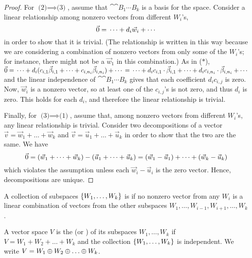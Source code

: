\begin{proof}
For $\text{(2)}\implies\text{(3)}$,
assume that $\cat{\cat{B_1}{\cdots}}{B_k}$ is a basis for the space.
Consider a linear relationship among nonzero vectors from different
$W_i$'s, 
\begin{equation*}
  \vec{0}=\mbox{}\dots+d_i\vec{w}_i+\cdots\mbox{}
\end{equation*}
in order to show that it is trivial.
(The relationship is written in this way because we are considering a
combination of nonzero vectors from only some of the $W_i$'s; 
for instance, there might not be a $\vec{w}_1$ in this combination.)
As in ($*$),
$
  \vec{0} 
   = \mbox{}\dots
      +d_i(c_{i,1}\vec{\beta}_{i,1}+\dots+c_{i,n_i}\vec{\beta}_{i,n_i})
      +\cdots\mbox{}                                                       
   = \mbox{}\dots
      +d_ic_{i,1}\cdot\vec{\beta}_{i,1}
      +\dots+
      d_ic_{i,n_i}\cdot\vec{\beta}_{i,n_i}
      +\cdots\mbox{}                                                      
$
and the linear independence of $\cat{\cat{B_1}{\cdots}}{B_k}$ gives that each
coefficient $d_ic_{i,j}$ is zero.
Now, $\vec{w}_i$ is a nonzero vector, so at least one of the 
$c_{i,j}$'s is not zero, and thus $d_i$ is zero.
This holds for each $d_i$, and therefore 
the linear relationship is trivial.

Finally, for $\text{(3)}\implies\text{(1)}$,
assume that, among nonzero vectors from different $W_i$'s, any linear
relationship is trivial.
Consider two decompositions of a vector 
$\vec{v}=\vec{w}_1+\dots+\vec{w}_k$ and $\vec{v}=\vec{u}_1+\dots+\vec{u}_k$
in order to show that the two are the same.
We have
\begin{equation*}
  \vec{0}
   =(\vec{w}_1+\dots+\vec{w}_k)
    -(\vec{u}_1+\dots+\vec{u}_k)
   =(\vec{w}_1-\vec{u}_1)+\dots+(\vec{w}_k-\vec{u}_k)
\end{equation*}
which violates the assumption unless each $\vec{w}_i-\vec{u}_i$ is the zero
vector.
Hence, decompositions are unique.
\end{proof}

\begin{definition}
A collection of subspaces \( \mbox{$\{W_1,\ldots, W_k\}$} \) is
if no nonzero vector from any \( W_i \) is a linear combination of
vectors from the other subspaces \( W_1,\dots, W_{i-1},W_{i+1},\dots, W_k \).
\end{definition}

\begin{definition}
A vector space \( V \) is the
(or ) 
of its subspaces \( W_1,\dots, W_k \) if
\( V=W_1+W_2+\dots +W_k \)
and the collection \( \mbox{$\{W_1,\dots, W_k\}$} \) is independent.
We write \( V=W_1\directsum W_2\directsum \dots\directsum W_k \).
\end{definition}

